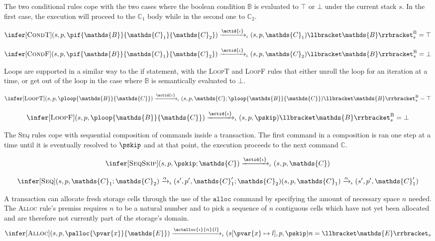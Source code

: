 The two conditional rules cope with the two cases where the boolean condition $\mathds{B}$ is evaluated to $\top$ or $\bot$ under the current stack $s$. In the first case, the execution will proceed to the $\mathds{C}_1$ body while in the second one to $\mathds{C}_2$.

\[
\infer[\textsc{CondT}]
{
	(s, p, \pif{\mathds{B}}{\mathds{C}_1}{\mathds{C}_2})
	\xrightarrow{\actid{\iota}}_\iota
	(s, p, \mathds{C}_1)
}
{
	\llbracket \mathds{B} \rrbracket_s^\textsc{B} = \top
}
\]

\[
\infer[\textsc{CondF}]
{
	(s, p, \pif{\mathds{B}}{\mathds{C}_1}{\mathds{C}_2})
	\xrightarrow{\actid{\iota}}_\iota
	(s, p, \mathds{C}_2)
}
{
	\llbracket \mathds{B} \rrbracket_s^\textsc{B} = \bot
}
\]

Loops are supported in a similar way to the if statement, with the \textsc{LoopT} and \textsc{LoopF} rules that either unroll the loop for an iteration at a time, or get out of the loop in the case where $\mathds{B}$ is semantically evaluated to $\bot$.

\[
\infer[\textsc{LoopT}]
{
	(s, p, \ploop{\mathds{B}}{\mathds{C}})
	\xrightarrow{\actid{\iota}}_\iota
	(s, p, \mathds{C}; \ploop{\mathds{B}}{\mathds{C}})
}
{
	\llbracket \mathds{B} \rrbracket_s^\textsc{B} = \top
}
\]

\[
\infer[\textsc{LoopF}]
{
	(s, p, \ploop{\mathds{B}}{\mathds{C}})
	\xrightarrow{\actid{\iota}}_\iota
	(s, p, \pskip)
}
{
	\llbracket \mathds{B} \rrbracket_s^\textsc{B} = \bot
}
\]

The \textsc{Seq} rules cope with sequential composition of commands inside a transaction. The first command in a composition is ran one step at a time until it is eventually resolved to $\pskip$ and at that point, the execution proceeds to the next command $\mathds{C}$.

\[
\infer[\textsc{SeqSkip}]
{
	(s, p, \pskip ; \mathds{C})
	\xrightarrow{\actid{\iota}}_\iota
	(s, p, \mathds{C})
}
{}
\]

\[
\infer[\textsc{Seq}]
{
	(s, p, \mathds{C}_1 ; \mathds{C}_2)
	\xrightarrow{\alpha}_\iota
	(s', p', \mathds{C}_1' ; \mathds{C}_2)
}
{
	(s, p, \mathds{C}_1)
	\xrightarrow{\alpha}_\iota
	(s', p', \mathds{C}_1')
}
\]

A transaction can allocate fresh storage cells through the use of the $\mathtt{alloc}$ command by specifying the amount of necessary space $n$ needed. The \textsc{Alloc} rule's premiss requires $n$ to be a natural number and to pick a sequence of $n$ contiguous cells which have not yet been allocated and are therefore not currently part of the storage's domain.
\[
\infer[\textsc{Alloc}]
{
	(s, p, \palloc{\pvar{x}}{\mathds{E}})
	\xrightarrow{\actalloc{\iota}{n}{l}}_\iota
	(s[\pvar{x} \mapsto l], p, \pskip)
}
{
	n = \llbracket \mathds{E} \rrbracket_s
}
\]

